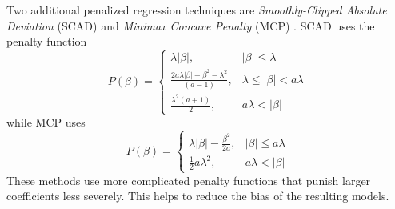 \documentclass{article}
\begin{document}
	Two additional penalized regression techniques are \textit{Smoothly-Clipped Absolute Deviation} (SCAD) and \textit{Minimax Concave Penalty} (MCP) \cite{fan2001variable, wang2007group}. SCAD uses the penalty function
	\begin{equation}
		P(\beta) = \left\{\begin{array}{ll}
				\lambda \vert \beta \vert, & \vert \beta \vert \leq \lambda \\
				\frac{2a\lambda\vert\beta\vert - \beta^2 - \lambda^2}{(a - 1)}, & \lambda \leq \vert \beta \vert < a\lambda \\
				\frac{\lambda^2(a+1)}{2}, & a\lambda < \vert \beta \vert
			\end{array}\right.
	\end{equation}
	while MCP \cite{zhang2010nearly} uses
	\begin{equation}
		P(\beta) = \left\{\begin{array}{ll}
			\lambda\vert \beta \vert - \frac{\beta^2}{2a}, & \vert \beta \vert \leq a\lambda \\
			\frac{1}{2}a\lambda^2, & a\lambda < \vert \beta \vert
		\end{array}\right.
	\end{equation}
	These methods use more complicated penalty functions that punish larger coefficients less severely. This helps to reduce the bias of the resulting models.
\end{document}
